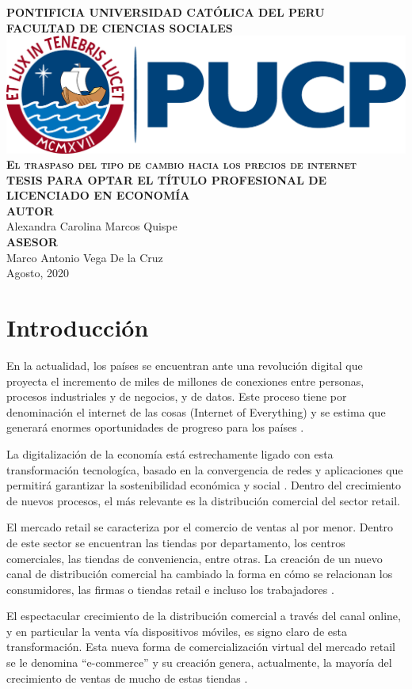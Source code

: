 \documentclass[12pt,a4paper,pdflatex]{article}
\def\portada{
\mbox{}\\[-2cm]
\begin{center}
    \mbox{}\\[6mm]
    \large\textsc{\textbf{\institucion}} \\[1mm]
    \large\textsc{\textbf{\facultad}}\\[12mm]
    \includegraphics[scale=0.5]{logopucp.png}\\[10mm]
    \large\textsc{\textbf{\title}}\\[8mm]
    \large{\textbf{\presentacion}}\\[10mm]
    \large{\textbf{\textoa}}\\[1.75mm]
    \large{\textsf{\author}}\\[8mm]
    \large{\textbf{\textob}}\\[1.75mm]
    \large{\textsf{\asesor}}\\[11mm]
    \large{\textsf{\date}}\\
\end{center}
}
\def\institucion{PONTIFICIA UNIVERSIDAD CAT\'OLICA DEL PERU}
\def\facultad{FACULTAD DE CIENCIAS SOCIALES}
\def\title{El traspaso del tipo de cambio hacia los precios de internet}
\def\presentacion{TESIS PARA OPTAR EL T\'ITULO PROFESIONAL DE LICENCIADO EN ECONOM\'IA}
\def\textoa{AUTOR}
\def\author{Alexandra Carolina Marcos Quispe}
\def\textob{ASESOR}
\def\asesor{Marco Antonio Vega De la Cruz}
\def\date{Agosto, 2020}
\begin{document}
\portada

\thispagestyle{empty}


\begin{abstract}
Insertar abstract
\\
Palabras Claves:\\
Clasificaci\'on JEL:
\end{abstract}
\thispagestyle{empty}
\clearpage

\tableofcontents
\thispagestyle{empty}
\clearpage
\listoffigures
\thispagestyle{empty}
\clearpage
\listoftables
\thispagestyle{empty}
\clearpage

\newpage

\section{Introducci\'on}\label{sec1}

En la actualidad, los pa\'ises se encuentran ante una revoluci\'on digital que proyecta el incremento de miles de millones de conexiones entre personas, procesos industriales y de negocios, y de datos. Este proceso tiene por denominaci\'on el internet de las cosas (Internet of Everything) y se estima que generar\'a enormes oportunidades de progreso para los pa\'ises \citep{lombardero2015trabajar}.

La digitalizaci\'on de la econom\'ia est\'a estrechamente ligado con esta transformaci\'on tecnolog\'ica, basado en la convergencia de redes y aplicaciones que permitir\'a garantizar la sostenibilidad econ\'omica y social \citep{lombardero2015trabajar}. Dentro del crecimiento de nuevos procesos, el m\'as relevante es la distribuci\'on comercial del sector retail.

El mercado retail se caracteriza por el comercio de ventas al por menor. Dentro de este sector se encuentran las tiendas por departamento, los centros comerciales, las tiendas de conveniencia, entre otras. La creaci\'on de un nuevo canal de distribuci\'on comercial ha cambiado la forma en c\'omo se relacionan los consumidores, las firmas o tiendas retail e incluso los trabajadores \citep{rey2017transformacion}. 

El espectacular crecimiento de la distribuci\'on comercial a trav\'es del canal online, y en particular la venta v\'ia dispositivos m\'oviles, es signo claro de esta transformaci\'on. Esta nueva forma de comercializaci\'on virtual del mercado retail se le denomina "`e-commerce"' y su creaci\'on genera, actualmente, la mayor\'ia del crecimiento de ventas de mucho de estas tiendas \citep{global2016global}.
\end{document}
